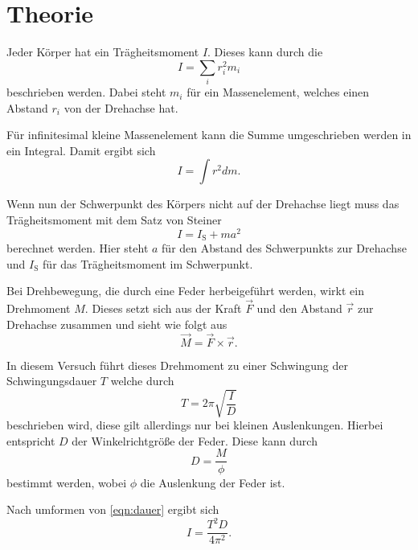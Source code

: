 \section{Theorie}
\label{sec:Theorie}

Jeder Körper hat ein Trägheitsmoment $I$.
Dieses kann durch die 
\begin{equation*}
    I = \sum_i r_i^2 m_i
\end{equation*}
beschrieben werden. Dabei steht $m_i$ für ein Massenelement, welches einen Abstand $r_i$ von der Drehachse hat.

Für infinitesimal kleine Massenelement kann die Summe umgeschrieben werden in ein Integral.
Damit ergibt sich 
\begin{equation*}
    I = \int r^2 dm .
\end{equation*}

Wenn nun der Schwerpunkt des Körpers nicht auf der Drehachse liegt muss das Trägheitsmoment mit dem Satz von Steiner
\begin{equation}
    I = I_\text{S} + m a^2
    \label{eqn:steiner}
\end{equation}
berechnet werden. Hier steht $a$ für den Abstand des Schwerpunkts zur Drehachse und $I_\text{S}$ für das Trägheitsmoment im Schwerpunkt.

Bei Drehbewegung, die durch eine Feder herbeigeführt werden, wirkt ein Drehmoment $M$.
Dieses setzt sich aus der Kraft $\vec{F}$ und den Abstand $\vec{r}$ zur Drehachse zusammen und sieht wie folgt aus
\begin{equation*}
    \vec{M} = \vec{F} \times \vec{r} .
\end{equation*} 

In diesem Versuch führt dieses Drehmoment zu einer Schwingung der Schwingungsdauer $T$ welche durch 
\begin{equation}
    T = 2\pi \sqrt{\frac{I}{D}}
    \label{eqn:dauer}
\end{equation}
beschrieben wird, diese gilt allerdings nur bei kleinen Auslenkungen.
Hierbei entspricht $D$ der Winkelrichtgröße der Feder.
Diese kann durch 
\begin{equation}
    D = \frac{M}{\phi}
    \label{eqn:federstarke}
\end{equation}
bestimmt werden, wobei $\phi$ die Auslenkung der Feder ist.

Nach umformen von \ref{eqn:dauer} ergibt sich
\begin{equation}
    I = \frac{T^2 D}{4 \pi^2} .
    \label{eqn:tragheit}
\end{equation}

